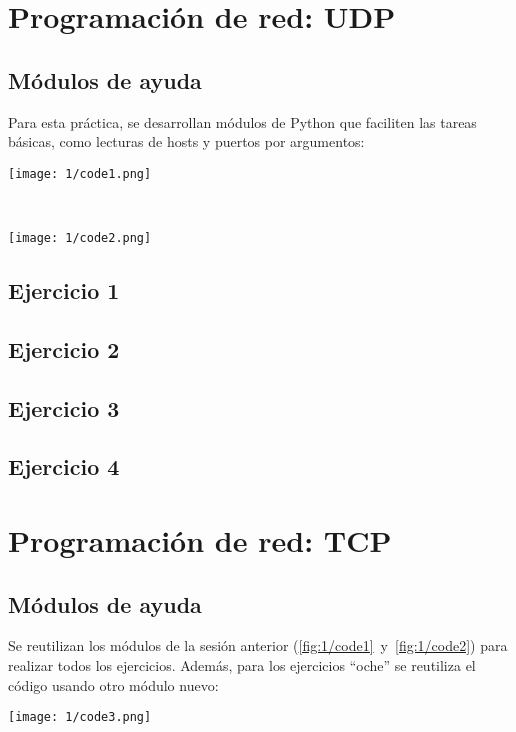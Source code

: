 \section{Programación de red: UDP}
\subsection{Módulos de ayuda}
Para esta práctica, se desarrollan módulos de Python que faciliten las tareas básicas,
como lecturas de hosts y puertos por argumentos: \\
\begin{minipage}{\linewidth}
	\centering
	\texttt{[image: 1/code1.png]}
	\label{fig:1/code1}
\end{minipage}
\\
\begin{minipage}{\linewidth}
	\centering
	\texttt{[image: 1/code2.png]}
	\label{fig:1/code2}
\end{minipage}

\subsection{Ejercicio 1}

\subsection{Ejercicio 2}

\subsection{Ejercicio 3}

\subsection{Ejercicio 4}

\section{Programación de red: TCP}
\subsection{Módulos de ayuda}
Se reutilizan los módulos de la sesión anterior (\ref{fig:1/code1}~y~\ref{fig:1/code2}) para
realizar todos los ejercicios. Además, para los ejercicios ``oche'' se reutiliza el código
usando otro módulo nuevo: \\
\begin{minipage}{\linewidth}
	\centering
	\texttt{[image: 1/code3.png]}
	\label{fig:1/code3}
\end{minipage}

